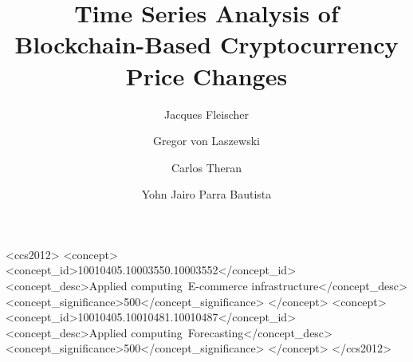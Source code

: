 \documentclass[sigconf]{acmart}
\begin{document}
\title{Time Series Analysis of Blockchain-Based Cryptocurrency Price Changes}

\author{Jacques Fleischer}

\author{Gregor von Laszewski}

\author{Carlos Theran}

\author{Yohn Jairo Parra Bautista}


\renewcommand{\shortauthors}{J.P. Fleischer, G. von Laszewski, C. Theran, Y. J. Parra Bautista.}



\begin{CCSXML}
<ccs2012>
 <concept>
  <concept_id>10010405.10003550.10003552</concept_id>
  <concept_desc>Applied computing~E-commerce infrastructure</concept_desc>
  <concept_significance>500</concept_significance>
 </concept>
 <concept>
  <concept_id>10010405.10010481.10010487</concept_id>
  <concept_desc>Applied computing~Forecasting</concept_desc>
  <concept_significance>500</concept_significance>
 </concept>
</ccs2012>
\end{CCSXML}



\maketitle





\end{document}
